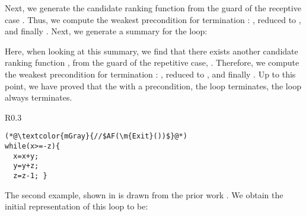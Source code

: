 \documentclass[acmsmall,screen,review,anonymous,nonacm]{acmart}
\begin{document}
\begin{center}
\end{center}

Next, we generate the candidate ranking function  from the guard of the receptive case \code{[x{\geq}0]}. 
Thus, we compute the weakest precondition for termination \wrt {}: 
, reduced to 
, and finally . 
Next, we generate a summary for the loop: 

\begin{center}
\end{center}


Here, when looking at this summary, we find that there exists another candidate ranking function , from the guard of the repetitive case, \ie  \code{[y{<}1]}. 
Therefore, we compute the weakest precondition for termination \wrt {}:  
, reduced to , and finally 
. 
Up to this point, we have proved that the with a  precondition, the loop terminates, \ie  the loop always terminates. 


\begin{wrapfigure}{R}{0.3\columnwidth}
\vspace{-8mm}
\begin{lstlisting}[xleftmargin=0.5em,numbersep=6pt,basicstyle=\footnotesize\ttfamily]
(*@\textcolor{mGray}{//$AF(\m{Exit}())$}@*) 
while(x>=-z){
  x=x+y;
  y=y+z;
  z=z-1; }
\end{lstlisting} 
\vspace{-1mm}
\caption{M$\effect$RF 2} 
\label{fig:multiphase_ex2}
\vspace{-5mm}
\end{wrapfigure}

The second example, shown in   is drawn from the prior work \cite{DBLP:conf/cav/Ben-AmramG17}. 
We obtain the initial representation of this loop to be: 
\end{document}
